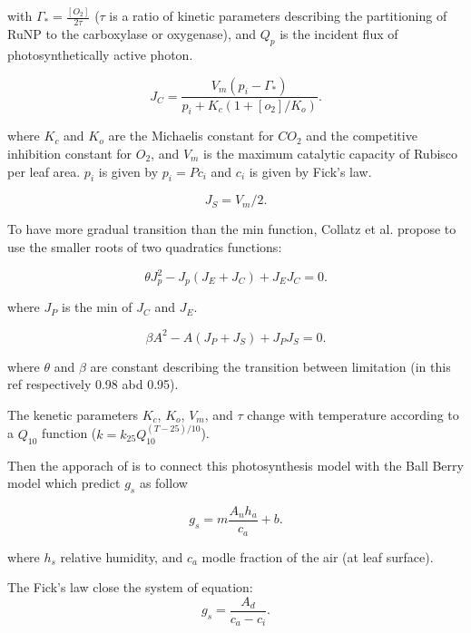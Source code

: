 \documentclass[a4paper,11pt]{article}
\begin{document}
with $\Gamma_* = \frac{[O_2]}{2\tau}$ ($\tau$ is a ratio of kinetic parameters describing the partitioning of RuNP to the carboxylase or oxygenase), and $Q_p$ is the incident flux of photosynthetically active photon.

\begin{equation}
\label{eq:JE}
J_C= \frac{V_m (p_i - \Gamma_*)}{p_i + K_c (1+[o_2]/K_o)}.
\end{equation}

where $K_c$ and $K_o$ are the Michaelis constant for $CO_2$ and the competitive inhibition constant for $O_2$, and $V_m$ is the maximum catalytic capacity of Rubisco per leaf area.
$p_i$ is given by $p_i = P c_i$ and $c_i$ is given by Fick's law.

\begin{equation}
\label{eq:JS}
J_S= V_m/2.
\end{equation}

To have more gradual transition than the min function, Collatz et al. propose to use the smaller roots of two quadratics functions:

\begin{equation}
\label{eq:Q1}
\theta J_p^2 - J_p(J_E+J_C) + J_E J_C= 0.
\end{equation}

where $J_P$ is the min of $J_C$ and $J_E$.

\begin{equation}
\label{eq:Q2}
\beta A^2 - A(J_P+J_S) + J_P J_S= 0.
\end{equation}

where $\theta$ and $\beta$ are constant describing the transition between limitation (in this ref respectively 0.98 abd 0.95).

The kenetic parameters $K_c$, $K_o$, $V_m$, and $\tau$ change with temperature according to a $Q_{10}$ function ($k = k_{25} Q_{10}^{(T-25)/10}$).

Then the apporach of \citet{Collatz-1991} is to connect this photosynthesis model with the Ball Berry model which predict $g_s$  as follow

\begin{equation}
\label{eq:gs}
g_s= m \frac{A_n h_a}{c_a}+b.
\end{equation}

where $h_s$ relative humidity, and $c_a$ modle fraction of the air (at leaf surface).

The Fick's law close the system of equation:
\begin{equation}
\label{eq:fick}
g_s=\frac{A_d}{c_a - c_i}.
\end{equation}
\end{document}
